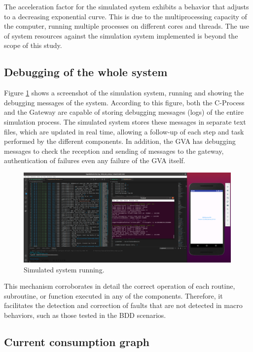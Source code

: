 \documentclass[journal]{IEEEtran}	%
\begin{document}
The acceleration factor for the simulated system exhibits a behavior that adjusts to a decreasing exponential curve. This is due to the multiprocessing capacity of the computer, running multiple processes on different cores and threads. The use of system resources against the simulation system implemented is beyond the scope of this study.


\subsection{Debugging of the whole system}


Figure \ref{fig:simulated-system} shows a screenshot of the simulation system, running and showing the debugging messages of the system. According to this figure, both the C-Process and the Gateway are capable of storing debugging messages (logs) of the entire simulation process. The simulated system stores these messages in separate text files, which are updated in real time, allowing a follow-up of each step and task performed by the different components. In addition, the GVA has debugging messages to check the reception and sending of messages to the gateway, authentication of failures even any failure of the GVA itself.

\begin{figure}[t!]
\centering
\includegraphics[width=0.99\textwidth]{simulated.png}
\caption{Simulated system running.}
\label{fig:simulated-system}
\end{figure}

This mechanism corroborates in detail the correct operation of each routine, subroutine, or function executed in any of the components. Therefore, it facilitates the detection and correction of faults that are not detected in macro behaviors, such as those tested in the BDD scenarios.


\subsection{Current consumption graph}
\end{document}
